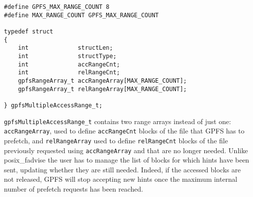 \begin{lstlisting}[frame=single]
#define GPFS_MAX_RANGE_COUNT 8
#define MAX_RANGE_COUNT GPFS_MAX_RANGE_COUNT

typedef struct 
{
    int              structLen;      
    int              structType;     
    int              accRangeCnt;    
    int              relRangeCnt;    
    gpfsRangeArray_t accRangeArray[MAX_RANGE_COUNT];
    gpfsRangeArray_t relRangeArray[MAX_RANGE_COUNT];

} gpfsMultipleAccessRange_t; 
\end{lstlisting}

\texttt{gpfsMultipleAccessRange\_t} contains two range arrays instead of just one: \texttt{accRangeArray}, used to define \texttt{accRangeCnt} blocks of the file that GPFS has to prefetch, and \texttt{relRangeArray} used to define \texttt{relRangeCnt} blocks of the file previously requested using \texttt{accRangeArray} and that are no longer needed. Unlike posix\_fadvise the user has to manage the list of blocks for which hints have been sent, updating whether they are still needed. Indeed, if the accessed blocks are not released, GPFS will stop accepting new hints once the maximum internal number of prefetch requests has been reached. %


